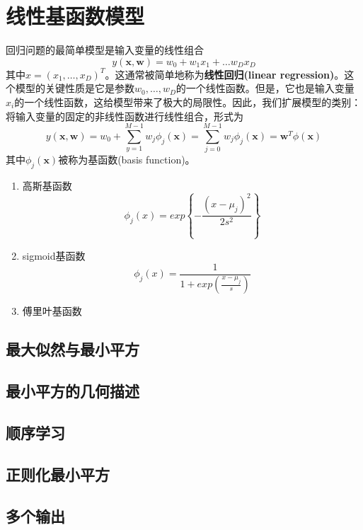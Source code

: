 \section{线性基函数模型}
回归问题的最简单模型是输入变量的线性组合
$$
y(\boldsymbol{x,w})=w_0+w_1x_1 + \dots w_Dx_D
$$
其中$x=(x_1,\dots,x_D)^T$。这通常被简单地称为\textbf{线性回归(linear regression)}。这个模型的关键性质是它是参数$w_0,\dots,w_D$的一个线性函数。但是，它也是输入变量$x_i$的一个线性函数，这给模型带来了极大的局限性。因此，我们扩展模型的类别：将输入变量的固定的非线性函数进行线性组合，形式为
$$
y(\boldsymbol{x,w})=w_0+\sum_{y=1}^{M-1}w_j\phi_j(\boldsymbol{x})=\sum_{j=0}^{M-1}w_j\phi_j(\boldsymbol{x})=\boldsymbol{w}^T\phi(\boldsymbol{x})
$$
其中$\phi_j(\boldsymbol{x})$被称为基函数(basis function)。
\begin{enumerate}
	\item 高斯基函数 
	$$
	\phi_j(x)=exp\left\{-\frac{(x-\mu_j)^2}{2s^2}\right\}
	$$
	\item sigmoid基函数 
	$$
	\phi_j(x)=\frac{1}{1+exp\left(\frac{x-\mu_j}{s}\right)}
	$$
	\item 傅里叶基函数
\end{enumerate}
\subsection*{最大似然与最小平方}
\subsection*{最小平方的几何描述}
\subsection*{顺序学习}
\subsection*{正则化最小平方}
\subsection*{多个输出}